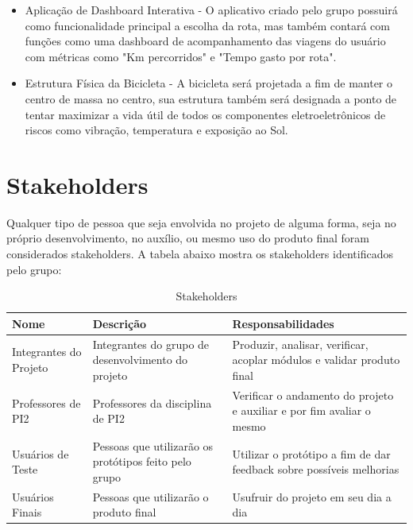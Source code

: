 \begin{apendicesenv}
\begin{itemize}
	\item Aplicação de Dashboard Interativa - O aplicativo criado pelo grupo possuirá como funcionalidade principal a escolha da rota, mas também contará com funções como uma dashboard de acompanhamento das viagens do usuário com métricas como "Km percorridos" e "Tempo gasto por rota".
	\item Estrutura Física da Bicicleta - A bicicleta será projetada a fim de manter o centro de massa no centro, sua estrutura também será designada a ponto de tentar maximizar a vida útil de todos os componentes eletroeletrônicos de riscos como vibração, temperatura e exposição ao Sol. 
\end{itemize}

\section{Stakeholders}
Qualquer tipo de pessoa que seja envolvida no projeto de alguma forma, seja no próprio desenvolvimento, no auxílio, ou mesmo uso do produto final foram considerados stakeholders.  A tabela abaixo mostra os stakeholders identificados pelo grupo:

\begin{table}[h!]
\centering
\caption{Stakeholders}
\label{my-label}
\begin{tabular}{|lll|}
\hline
\multicolumn{1}{|l|}{\textbf{Nome}} & \multicolumn{1}{l|}{\textbf{Descrição}}               & \textbf{Responsabilidades}                                             \\ \hline
Integrantes do Projeto              & Integrantes do grupo de desenvolvimento do projeto    & Produzir, analisar, verificar, acoplar módulos e validar produto final \\
Professores de PI2                  & Professores da disciplina de PI2                      & Verificar o andamento do projeto e auxiliar e por fim avaliar o mesmo  \\
Usuários de Teste                   & Pessoas que utilizarão os protótipos feito pelo grupo & Utilizar o protótipo a fim de dar feedback sobre possíveis melhorias   \\
Usuários Finais                     & Pessoas que utilizarão o produto final                & Usufruir do projeto em seu dia a dia                                   \\ \hline
\end{tabular}
\end{table}



\end{apendicesenv}
